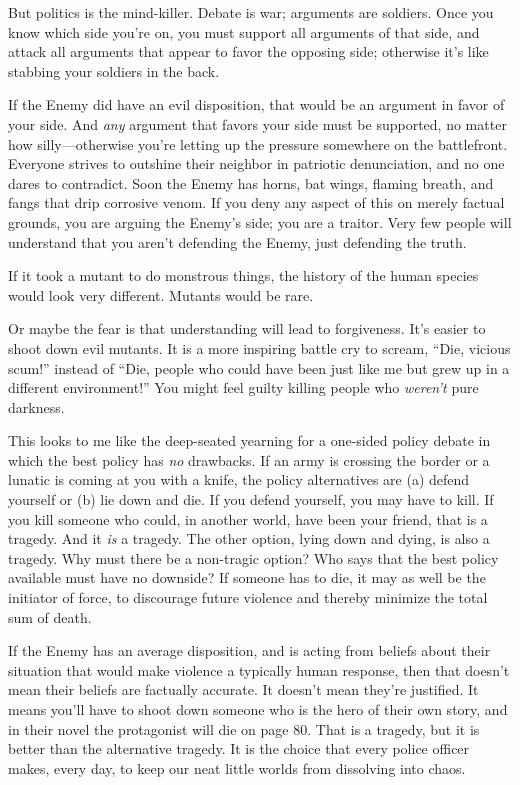 {
 But politics is the mind-killer. Debate is war; arguments are
soldiers. Once you know which side you're on, you must
support all arguments of that side, and attack all arguments that
appear to favor the opposing side; otherwise it's like
stabbing your soldiers in the back.}

{
 If the Enemy did have an evil disposition, that would be an
argument in favor of your side. And \textit{any} argument that favors
your side must be supported, no matter how silly---otherwise
you're letting up the pressure somewhere on the
battlefront. Everyone strives to outshine their neighbor in patriotic
denunciation, and no one dares to contradict. Soon the Enemy has horns,
bat wings, flaming breath, and fangs that drip corrosive venom. If you
deny any aspect of this on merely factual grounds, you are arguing the
Enemy's side; you are a traitor. Very few people will
understand that you aren't defending the Enemy, just
defending the truth.}

{
 If it took a mutant to do monstrous things, the history of the
human species would look very different. Mutants would be rare.}

{
 Or maybe the fear is that understanding will lead to forgiveness.
It's easier to shoot down evil mutants. It is a more
inspiring battle cry to scream, ``Die, vicious
scum!'' instead of ``Die, people who
could have been just like me but grew up in a different
environment!'' You might feel guilty killing people
who \textit{weren't} pure darkness.}

{
 This looks to me like the deep-seated yearning for a one-sided
policy debate in which the best policy has \textit{no} drawbacks. If an
army is crossing the border or a lunatic is coming at you with a knife,
the policy alternatives are (a) defend yourself or (b) lie down and
die. If you defend yourself, you may have to kill. If you kill someone
who could, in another world, have been your friend, that is a tragedy.
And it \textit{is} a tragedy. The other option, lying down and dying,
is also a tragedy. Why must there be a non-tragic option? Who says that
the best policy available must have no downside? If someone has to die,
it may as well be the initiator of force, to discourage future violence
and thereby minimize the total sum of death.}

{
 If the Enemy has an average disposition, and is acting from
beliefs about their situation that would make violence a typically
human response, then that doesn't mean their beliefs
are factually accurate. It doesn't mean
they're justified. It means you'll have
to shoot down someone who is the hero of their own story, and in their
novel the protagonist will die on page 80. That is a tragedy, but it is
better than the alternative tragedy. It is the choice that every police
officer makes, every day, to keep our neat little worlds from
dissolving into chaos.}

